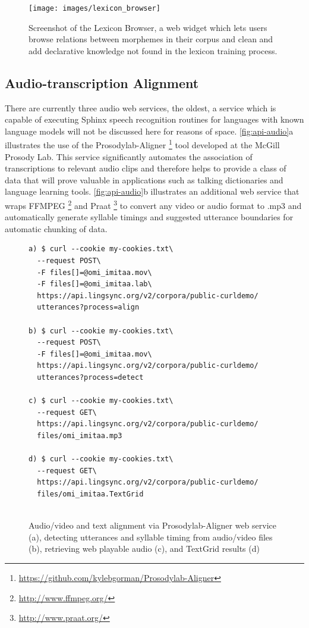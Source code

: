 \documentclass[11pt]{article}
\begin{document}
\begin{figure}
\begin{center}
\texttt{[image: images/lexicon\_browser]}
\caption{Screenshot of the Lexicon Browser, a web widget which lets users browse relations between morphemes in their corpus and clean and add declarative knowledge not found in the lexicon training process.}
\label{lexicon_browser_screenshot}
\end{center}
\end{figure}




\subsection{Audio-transcription Alignment}
\label{sec:aligner}

There are currently three audio web services, the oldest, a service which is capable of executing  Sphinx speech recognition routines for languages with known language models  will not be discussed here for reasons of space.
\autoref{fig:api-audio}a illustrates the use of the
Prosodylab-Aligner%
\footnote{\url{https://github.com/kylebgorman/Prosodylab-Aligner}} %
tool developed at the McGill Prosody Lab. This service significantly automates
the association of transcriptions to relevant audio clips and therefore helps
to provide a class of data that will prove valuable in applications such as
talking dictionaries and language learning tools. \autoref{fig:api-audio}b
illustrates an additional web service that wraps
FFMPEG%
\footnote{\url{http://www.ffmpeg.org/}} %
and Praat%
\footnote{\url{http://www.praat.org/}} %
to convert any video or audio format to .mp3 and automatically generate
syllable timings and suggested utterance boundaries \cite{DeJong:2009} for automatic chunking of
data.


\begin{figure}[h]
\scriptsize
\begin{verbatim}
a) $ curl --cookie my-cookies.txt\
  --request POST\
  -F files[]=@omi_imitaa.mov\
  -F files[]=@omi_imitaa.lab\
  https://api.lingsync.org/v2/corpora/public-curldemo/
  utterances?process=align

b) $ curl --cookie my-cookies.txt\
  --request POST\
  -F files[]=@omi_imitaa.mov\
  https://api.lingsync.org/v2/corpora/public-curldemo/
  utterances?process=detect
  
c) $ curl --cookie my-cookies.txt\
  --request GET\
  https://api.lingsync.org/v2/corpora/public-curldemo/
  files/omi_imitaa.mp3
 
d) $ curl --cookie my-cookies.txt\
  --request GET\
  https://api.lingsync.org/v2/corpora/public-curldemo/
  files/omi_imitaa.TextGrid
   
\end{verbatim}
\caption{Audio/video and text alignment via Prosodylab-Aligner web service (a), detecting utterances and syllable timing from audio/video files (b), retrieving web playable audio (c), and TextGrid results (d)}
\normalsize
\label{fig:api-audio}
\end{figure}
\end{document}
